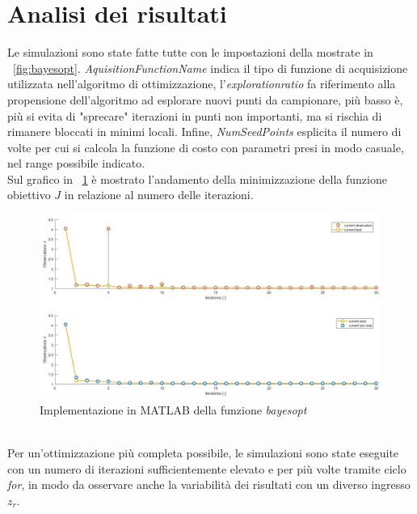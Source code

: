 \section{Analisi dei risultati}
Le simulazioni sono state fatte tutte con le impostazioni della \cite{bayesopt} mostrate in \figurename \ \ref{fig:bayesopt}. \textit{AquisitionFunctionName} indica il tipo di funzione di acquisizione utilizzata nell'algoritmo di ottimizzazione, l'\textit{explorationratio} fa riferimento alla propensione dell'algoritmo ad esplorare nuovi punti da campionare, più basso è, più si evita di "sprecare" iterazioni in punti non importanti, ma si rischia di rimanere bloccati in minimi locali. Infine, \nobreakdash\textit{NumSeedPoints} esplicita il numero di volte per cui si calcola la funzione di costo con parametri presi in modo casuale, nel range possibile indicato.\\
Sul grafico in \figurename \ \ref{fig:plotJ} è mostrato l'andamento della minimizzazione della funzione obiettivo $J$ in relazione al numero delle iterazioni.
\begin{figure}[htb]
	\centering
	\includegraphics[scale=0.7]{figure/plotJ.jpg}
	\caption{Implementazione in MATLAB della funzione \textit{bayesopt}}
	\label{fig:plotJ}
\end{figure}\\
Per un'ottimizzazione più completa possibile, le simulazioni sono state eseguite con un numero di iterazioni sufficientemente elevato e per più volte tramite ciclo \textit{for}, in modo da osservare anche la variabilità dei risultati con un diverso ingresso $z_r$.\\

